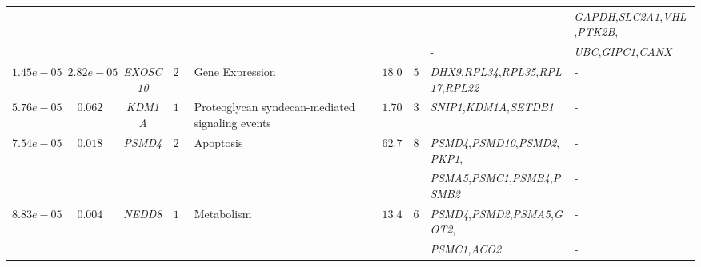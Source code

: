 \documentclass[10pt]{article}
\begin{document}
{\begin{landscape}
\begin{table}[!htbp]
{\begin{tabular}{c c c c l c c l l}
& & & & & & & - &\textit{GAPDH},\textit{SLC2A1},\textit{VHL},\textit{PTK2B},\tabularnewline
& & & & & & & - &\textit{UBC},\textit{GIPC1},\textit{CANX} \tabularnewline

$1.45e-05$ & $2.82e-05$ & \textit{EXOSC10} & $21$ & Gene Expression & $18.02$ & $5$ & \textit{DHX9},\textit{RPL34},\textit{RPL35},\textit{RPL17},\textit{RPL22}&\textit{-} \tabularnewline

$5.76e-05$ & $0.062$ & \textit{KDM1A} & $15$ & Proteoglycan syndecan-mediated signaling events & $1.70$ & $3$ & \textit{SNIP1},\textit{KDM1A},\textit{SETDB1}&\textit{-} \tabularnewline

$7.54e-05$ & $0.018$ & \textit{PSMD4} & $26$ & Apoptosis & $62.79$ & $8$ & \textit{PSMD4},\textit{PSMD10},\textit{PSMD2},\textit{PKP1},&\textit{-} \tabularnewline

& & & & & & & \textit{PSMA5},\textit{PSMC1},\textit{PSMB4},\textit{PSMB2}&\textit{-} \tabularnewline

$8.83e-05$ & $0.004$ & \textit{NEDD8} & $12$ & Metabolism & $13.44$ & $6$ & \textit{PSMD4},\textit{PSMD2},\textit{PSMA5},\textit{GOT2},&\textit{-}\tabularnewline

& & & & & & &\textit{PSMC1},\textit{ACO2}&\textit{-} \\[1.5pt]\hline\hline
\end{tabular}}
\label{tab:mod}
\end{table}
\end{landscape}
\newpage

\begin{landscape}
\begin{table}[!htbp]
\caption{\textbf{\small{Post GWAS analysis at the sub-network level comparing dmGWAS and ancGWAS using the pathway-based simulation data set: Top $20$ genes with moderate/significant $p$-values obtained (based on Liptak-Stouffer method) at the sub-network level derived from ancGWAS and dmGWAS \cite{jia}. The table displays the top biological pathway associated with each sub-network from both methods, and the score of overlap ($Z\_w$) between the sub-network and the associated biological pathway. $\#$Overlaps denotes the number of overlapping genes between sub-network and corresponding pathway. OvP-disease provides the list of overlapping genes between the sub-network and the simulated disease genes. In bold are the simulated disease genes.}}}
\centering
{}%
\end{table}
\end{landscape}}
\end{document}

